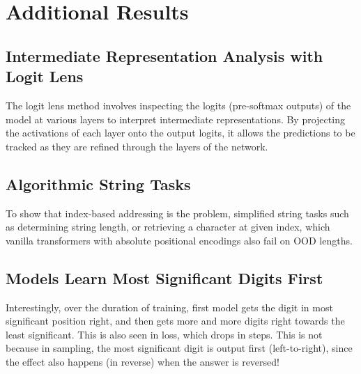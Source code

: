 \chapter{Additional Results}\label{app:additional_results}


\section{Intermediate Representation Analysis with Logit Lens}
The logit lens method \parencite{nostalgebraist_interpreting_2020} involves inspecting the logits (pre-softmax outputs) of the model at various layers to interpret intermediate representations. By projecting the activations of each layer onto the output logits, it allows the predictions to be tracked as they are refined through the layers of the network.

\section{Algorithmic String Tasks}
To show that index-based addressing is the problem, simplified string tasks such as determining string length, or retrieving a character at given index, which vanilla transformers with absolute positional encodings also fail on OOD lengths.

\section{Models Learn Most Significant Digits First}
Interestingly, over the duration of training, first model gets the digit in most significant position right, and then gets more and more digits right towards the least significant. This is also seen in loss, which drops in steps. This is not because in sampling, the most significant digit is output first (left-to-right), since the effect also happens (in reverse) when the answer is reversed!

